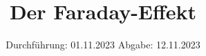 

\subject{V46}
\title{Der Faraday-Effekt}
\date{%
  Durchführung: 01.11.2023
  \hspace{3em}
  Abgabe: 12.11.2023
}



\maketitle
\setcounter{page}{1}







\printbibliography{}


